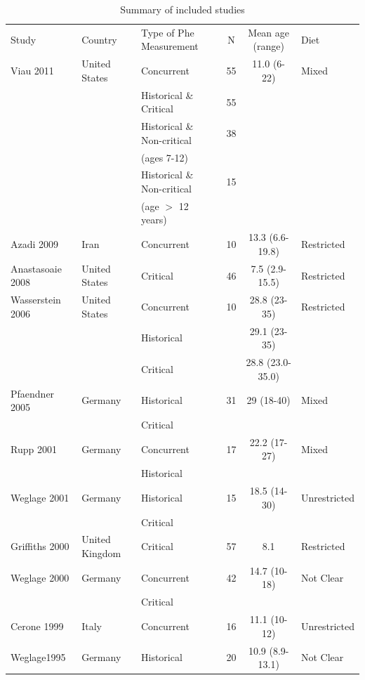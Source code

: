 \documentclass{svjour3}                     %
\begin{document}
\begin{table}

    \caption{Summary of included studies} \label{tab:studies}

    \begin{tabular}{lllccl}
    \hline\noalign{\smallskip}
    Study & Country & Type of Phe Measurement & N & Mean age (range) & Diet\\
    \noalign{\smallskip}\hline\noalign{\smallskip}
    Viau 2011 & United States & Concurrent & 55 & 11.0 (6-22) & Mixed\\
    & & Historical \& Critical & 55 & &\\
    & & Historical \& Non-critical & 38 & &\\
    & & (ages 7-12) & & & \\
    & & Historical \& Non-critical & 15 & &\\
    & & (age $>$ 12 years) & & & \\
    Azadi 2009 & Iran & Concurrent & 10 & 13.3 (6.6-19.8) & Restricted\\
    Anastasoaie 2008 & United States & Critical & 46 & 7.5 (2.9-15.5) & Restricted\\
    Wasserstein 2006 & United States & Concurrent & 10 & 28.8 (23-35) & Restricted\\
    & & Historical &  & 29.1 (23-35) & \\
    & & Critical &  & 28.8 (23.0-35.0) & \\
    Pfaendner 2005 & Germany & Historical & 31 & 29 (18-40) & Mixed\\
    & & Critical &  &  & \\
    Rupp 2001 & Germany & Concurrent & 17 & 22.2 (17-27) & Mixed\\
    & & Historical &  &  & \\
    Weglage 2001 & Germany & Historical & 15 & 18.5 (14-30) & Unrestricted\\
    & & Critical &  & & \\
    Griffiths 2000 & United Kingdom & Critical & 57 & 8.1 & Restricted\\
    Weglage 2000 & Germany & Concurrent & 42 & 14.7 (10-18) & Not Clear\\
    & & Critical & & &\\
    Cerone 1999 & Italy & Concurrent & 16 & 11.1 (10-12) & Unrestricted\\
    Weglage1995 & Germany & Historical & 20 & 10.9 (8.9-13.1) & Not Clear\\

\end{tabular}
\end{table}
\end{document}
